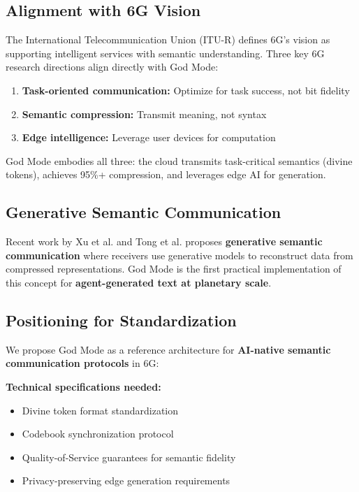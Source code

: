 \documentclass{article}
\begin{document}
\subsection{Alignment with 6G Vision}

The International Telecommunication Union (ITU-R) defines 6G's vision \cite{itur2023imt} as supporting intelligent services with semantic understanding. Three key 6G research directions align directly with God Mode:

\begin{enumerate}
    \item \textbf{Task-oriented communication:} Optimize for task success, not bit fidelity
    \item \textbf{Semantic compression:} Transmit meaning, not syntax
    \item \textbf{Edge intelligence:} Leverage user devices for computation
\end{enumerate}

God Mode embodies all three: the cloud transmits task-critical semantics (divine tokens), achieves 95\%+ compression, and leverages edge AI for generation.

\subsection{Generative Semantic Communication}

Recent work by Xu et al. \cite{xu2024generative} and Tong et al. \cite{tong2023generative} proposes \textbf{generative semantic communication} where receivers use generative models to reconstruct data from compressed representations. God Mode is the first practical implementation of this concept for \textbf{agent-generated text at planetary scale}.

\subsection{Positioning for Standardization}

We propose God Mode as a reference architecture for \textbf{AI-native semantic communication protocols} in 6G:

\textbf{Technical specifications needed:}
\begin{itemize}
    \item Divine token format standardization
    \item Codebook synchronization protocol
    \item Quality-of-Service guarantees for semantic fidelity
    \item Privacy-preserving edge generation requirements
\end{itemize}
\end{document}
